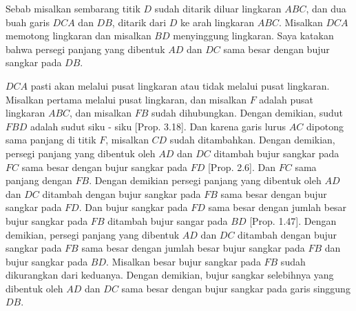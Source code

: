 \documentclass[a4paper]{book}
\begin{document}
Sebab misalkan sembarang titik $D$ sudah ditarik diluar lingkaran $ABC$,
dan dua buah garis $DCA$ dan $DB$, ditarik dari $D$ ke arah lingkaran $ABC$.
Misalkan $DCA$ memotong lingkaran dan misalkan $BD$ menyinggung lingkaran.
Saya katakan bahwa persegi panjang yang dibentuk $AD$ dan $DC$ sama besar
dengan bujur sangkar pada $DB$.

$DCA$ pasti akan melalui pusat lingkaran atau tidak melalui pusat lingkaran.
Misalkan pertama melalui pusat lingkaran, dan misalkan $F$ adalah pusat lingkaran
$ABC$, dan misalkan $FB$ sudah dihubungkan. Dengan demikian, sudut $FBD$ adalah 
sudut siku - siku [Prop. 3.18]. Dan karena garis lurus $AC$ dipotong sama
panjang di titik $F$, misalkan $CD$ sudah ditambahkan. Dengan demikian,
persegi panjang yang dibentuk oleh $AD$ dan $DC$ ditambah bujur sangkar pada $FC$
sama besar dengan bujur sangkar pada $FD$ [Prop. 2.6]. Dan $FC$ sama panjang
dengan $FB$. Dengan demikian persegi panjang yang dibentuk oleh $AD$ dan $DC$
ditambah dengan bujur sangkar pada $FB$ sama besar dengan bujur sangkar pada
$FD$. Dan bujur sangkar pada $FD$ sama besar dengan jumlah besar bujur sangkar 
pada $FB$ ditambah bujur sangar pada $BD$ [Prop. 1.47]. Dengan demikian,
persegi panjang yang dibentuk $AD$ dan $DC$ ditambah dengan bujur sangkar pada
$FB$ sama besar dengan jumlah besar bujur sangkar pada $FB$ dan bujur sangkar
pada $BD$. Misalkan besar bujur sangkar pada $FB$ sudah dikurangkan dari keduanya.
Dengan demikian, bujur sangkar selebihnya yang dibentuk oleh $AD$ dan $DC$ sama
besar dengan bujur sangkar pada garis singgung $DB$.
\end{document}
